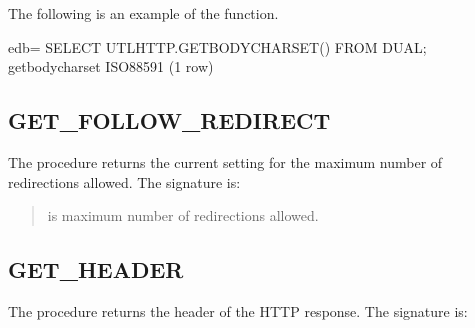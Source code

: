 \documentclass[letterpaper,10pt,english,openany,oneside]{sphinxmanual}
\begin{document}

The following is an example of the  function.

%
\begin{sphinxVerbatim}[commandchars=\\\{\}]
edb=\PYGZsh{} SELECT UTL\PYGZus{}HTTP.GET\PYGZus{}BODY\PYGZus{}CHARSET() FROM DUAL;
 get\PYGZus{}body\PYGZus{}charset
\PYGZhy{}\PYGZhy{}\PYGZhy{}\PYGZhy{}\PYGZhy{}\PYGZhy{}\PYGZhy{}\PYGZhy{}\PYGZhy{}\PYGZhy{}\PYGZhy{}\PYGZhy{}\PYGZhy{}\PYGZhy{}\PYGZhy{}\PYGZhy{}\PYGZhy{}\PYGZhy{}
 ISO\PYGZhy{}8859\PYGZhy{}1
(1 row)
\end{sphinxVerbatim}


\subsection{GET\_FOLLOW\_REDIRECT}
\label{\detokenize{utl_http:get-follow-redirect}}
The  procedure returns the current setting for the
maximum number of redirections allowed. The signature is:
\begin{quote}

\end{quote}


\begin{quote}

 is maximum number of redirections allowed.
\end{quote}


\subsection{GET\_HEADER}
\label{\detokenize{utl_http:get-header}}
The  procedure returns the  header of the HTTP
response. The signature is:
\begin{quote}

\begin{DUlineblock}{0em}
\item[] 
\item[] 
\end{DUlineblock}
\end{quote}
\end{document}
